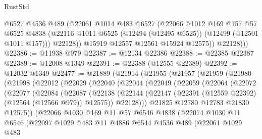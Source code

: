 \begin{lexlean}{RustStd}
\begin{coremodule}
{\begin{coremodule}
{{{{{{{{{{{{{{{{{{{{{{{{{{{{{{{{{{{{{{{{{{{{{{{{{{{{{{{{{{{{{{{{{{{{{{{{{{{{{{{{              @6527
              @4536
              @489
              (@22061
                @1014
                @483
                @6527
                (@22066
                  @1012
                  @169
                  @157
                  @57
                  @6525
                  @4838
                  (@22116 @1011 @6525 (@12494 (@12495 @6525)) (@12499 (@12501 @1011 @157)))
                  @22128))
              @15919
              @12557
              @12561
              @15924
              @12575))
          @22128)))
@22386 := @11938 @979
@22387 := @12134 @22386
@22388 := @22385 @22387
@22389 := @12008 @1349
@22391 := @22388 (@12555 @22389)
@22392 := @12032 @1349
@22477 := @21889
    (@21914
      (@21955
        (@21957
          (@21959
            (@21980
              (@21998
                (@22012
                  (@22029
                    (@22040
                      (@22044
                        (@22049
                          (@22059
                            (@22064
                              (@22072
                                (@22077
                                  (@22084
                                    (@22087
                                      (@22138
                                        (@22144
                                          (@22147
                                            (@22391 (@12559 @22392) (@12564 (@12566 @979)) @12575))
                                          @22128)))
                                    @21825
                                    @12780
                                    @12783
                                    @21830
                                    @12575))
                                (@22066
                                  @1030
                                  @169
                                  @11
                                  @57
                                  @6546
                                  @4838
                                  (@22074
                                    @1030
                                    @11
                                    @6546
                                    (@22097
                                      @1029
                                      @483
                                      @11
                                      @4886
                                      @6544
                                      @4536
                                      @489
                                      (@22061
                                        @1029
                                        @483
}}}}}}}}}}}}}}}}}}}}}}}}}}}}}}}}}}}}}}}}}}}}}}}}}}}}}}}}}}}}}}}}}}}}}}}}}}}}}}}}
\end{coremodule}}
\end{coremodule}
\end{lexlean}
